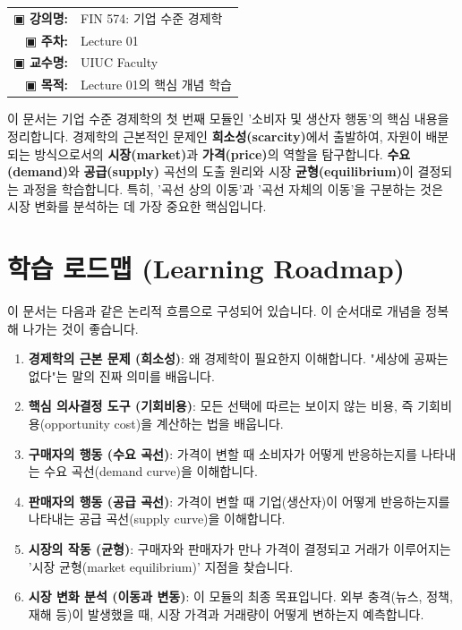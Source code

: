 \documentclass[11pt,a4paper]{article}
\makeatletter
\theoremstyle{definition}
\newcommand{\metainfo}[4]{
\begin{tcolorbox}[
    colback=lightpurple,
    colframe=darkpurple,
    boxrule=1pt,
    arc=2mm,
    left=10pt,
    right=10pt,
    top=8pt,
    bottom=8pt
]
\begin{tabular}{@{}rl@{}}
▣ \textbf{강의명:} & #1 \\[0.3em]
▣ \textbf{주차:} & #2 \\[0.3em]
▣ \textbf{교수명:} & #3 \\[0.3em]
▣ \textbf{목적:} & \begin{minipage}[t]{0.75\textwidth}#4\end{minipage}
\end{tabular}
\end{tcolorbox}
}
\makeatother
\begin{document}
\maketitle
\thispagestyle{firstpage}

\metainfo{FIN 574: 기업 수준 경제학}{Lecture 01}{UIUC Faculty}{Lecture 01의 핵심 개념 학습}


\begin{summarybox}
이 문서는 기업 수준 경제학의 첫 번째 모듈인 '소비자 및 생산자 행동'의 핵심 내용을 정리합니다. 경제학의 근본적인 문제인 \textbf{희소성(scarcity)}에서 출발하여, 자원이 배분되는 방식으로서의 \textbf{시장(market)}과 \textbf{가격(price)}의 역할을 탐구합니다. \textbf{수요(demand)}와 \textbf{공급(supply)} 곡선의 도출 원리와 시장 \textbf{균형(equilibrium)}이 결정되는 과정을 학습합니다. 특히, '곡선 상의 이동'과 '곡선 자체의 이동'을 구분하는 것은 시장 변화를 분석하는 데 가장 중요한 핵심입니다.
\end{summarybox}

\tableofcontents

\newpage

\section{학습 로드맵 (Learning Roadmap)}

이 문서는 다음과 같은 논리적 흐름으로 구성되어 있습니다. 이 순서대로 개념을 정복해 나가는 것이 좋습니다.

\begin{enumerate}
    \item \textbf{경제학의 근본 문제 (희소성)}: 왜 경제학이 필요한지 이해합니다. "세상에 공짜는 없다"는 말의 진짜 의미를 배웁니다.
    \item \textbf{핵심 의사결정 도구 (기회비용)}: 모든 선택에 따르는 보이지 않는 비용, 즉 기회비용(opportunity cost)을 계산하는 법을 배웁니다.
    \item \textbf{구매자의 행동 (수요 곡선)}: 가격이 변할 때 소비자가 어떻게 반응하는지를 나타내는 수요 곡선(demand curve)을 이해합니다.
    \item \textbf{판매자의 행동 (공급 곡선)}: 가격이 변할 때 기업(생산자)이 어떻게 반응하는지를 나타내는 공급 곡선(supply curve)을 이해합니다.
    \item \textbf{시장의 작동 (균형)}: 구매자와 판매자가 만나 가격이 결정되고 거래가 이루어지는 '시장 균형(market equilibrium)' 지점을 찾습니다.
    \item \textbf{시장 변화 분석 (이동과 변동)}: 이 모듈의 최종 목표입니다. 외부 충격(뉴스, 정책, 재해 등)이 발생했을 때, 시장 가격과 거래량이 어떻게 변하는지 예측합니다.
\end{enumerate}
\end{document}
